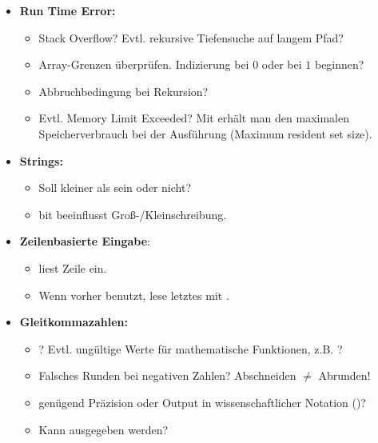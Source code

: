 \begin{itemize}
	\item \textbf{Run Time Error:}
	\begin{itemize}
		\item Stack Overflow? Evtl. rekursive Tiefensuche auf langem Pfad?
		\item Array-Grenzen überprüfen. Indizierung bei $0$ oder bei $1$ beginnen?
		\item Abbruchbedingung bei Rekursion?
		\item Evtl. Memory Limit Exceeded? Mit  erhält man den maximalen Speicherverbrauch bei der Ausführung (Maximum resident set size).
	\end{itemize}
	
	\item \textbf{Strings:}
	\begin{itemize}
		\item Soll  kleiner als  sein oder nicht?
		\item bit  beeinflusst Groß-/Kleinschreibung.
	\end{itemize}

	\item \textbf{Zeilenbasierte Eingabe}:
	\begin{itemize}
		\item {} liest Zeile ein.
		\item Wenn vorher  benutzt, lese letztes \code{\\n} mit .
	\end{itemize}
	
	\item \textbf{Gleitkommazahlen:}
	\begin{itemize}
		\item {}? Evtl. ungültige Werte für mathematische Funktionen, z.B. \mbox{}?
		\item Falsches Runden bei negativen Zahlen? Abschneiden $\neq$ Abrunden!
		\item genügend Präzision oder Output in wissenschaftlicher Notation ()?
		\item Kann  ausgegeben werden?
	\end{itemize}


\end{itemize}
